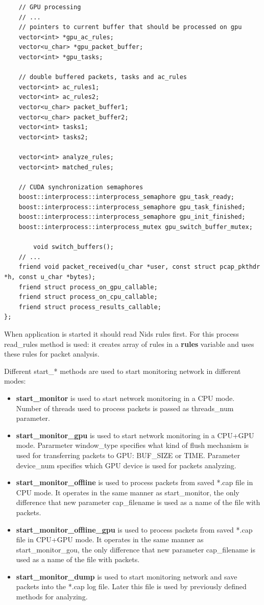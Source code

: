 \documentclass[thesis=M,english]{FITthesis}[2011/07/15]
\begin{document}
\begin{lstlisting}
    // GPU processing
    // ...
    // pointers to current buffer that should be processed on gpu
    vector<int> *gpu_ac_rules;
    vector<u_char> *gpu_packet_buffer;
    vector<int> *gpu_tasks;

    // double buffered packets, tasks and ac_rules
    vector<int> ac_rules1;
    vector<int> ac_rules2;
    vector<u_char> packet_buffer1;
    vector<u_char> packet_buffer2;
    vector<int> tasks1;
    vector<int> tasks2;

    vector<int> analyze_rules;
    vector<int> matched_rules;

    // CUDA synchronization semaphores
    boost::interprocess::interprocess_semaphore gpu_task_ready;
    boost::interprocess::interprocess_semaphore gpu_task_finished;
    boost::interprocess::interprocess_semaphore gpu_init_finished;
    boost::interprocess::interprocess_mutex gpu_switch_buffer_mutex;

		void switch_buffers();
    // ...
    friend void packet_received(u_char *user, const struct pcap_pkthdr *h, const u_char *bytes);
    friend struct process_on_gpu_callable;
    friend struct process_on_cpu_callable;
    friend struct process_results_callable;
};\end{lstlisting}

When application is started it should read Nids rules first. For this process read\_rules method is used: it creates array of rules in a \textbf{rules} variable and uses these rules for packet analysis.

Different start\_* methods are used to start monitoring network in different modes:
\begin{itemize}
\item \textbf{start\_monitor} is used to start network monitoring in a CPU mode. Number of threads used to process packets is passed as threads\_num parameter.
\item \textbf{start\_monitor\_gpu} is used to start network monitoring in a CPU+GPU mode. Pararmeter window\_type specifies what kind of flush mechanism is used for transferring packets to GPU: BUF\_SIZE or TIME. Parameter device\_num specifies which GPU device is used for packets analyzing.
\item \textbf{start\_monitor\_offline} is used to process packets from saved *.cap file in CPU mode. It operates in the same manner as start\_monitor, the only difference that new parameter cap\_filename is used as a name of the file with packets.
\item \textbf{start\_monitor\_offline\_gpu} is used to process packets from saved *.cap file in CPU+GPU mode. It operates in the same manner as start\_monitor\_gou, the only difference that new parameter cap\_filename is used as a name of the file with packets.
\item \textbf{start\_monitor\_dump} is used to start monitoring network and save packets into the *.cap log file. Later this file is used by previously defined methods for analyzing.
\end{itemize}
\end{document}
